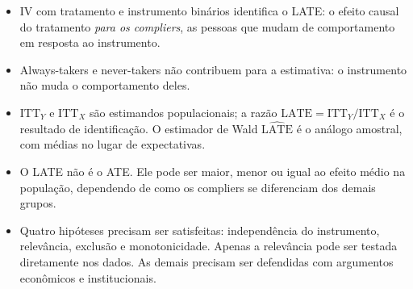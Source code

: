 \begin{notabox}
\begin{itemize}[leftmargin=*]
  \item IV com tratamento e instrumento binários identifica o LATE: o efeito causal do tratamento \textit{para os compliers}, as pessoas que mudam de comportamento em resposta ao instrumento.
  \item Always-takers e never-takers não contribuem para a estimativa: o instrumento não muda o comportamento deles.
  \item $\text{ITT}_Y$ e $\text{ITT}_X$ são estimandos populacionais; a razão $\text{LATE} = \text{ITT}_Y / \text{ITT}_X$ é o resultado de identificação. O estimador de Wald $\widehat{\text{LATE}}$ é o análogo amostral, com médias no lugar de expectativas.
  \item O LATE não é o ATE. Ele pode ser maior, menor ou igual ao efeito médio na população, dependendo de como os compliers se diferenciam dos demais grupos.
  \item Quatro hipóteses precisam ser satisfeitas: independência do instrumento, relevância, exclusão e monotonicidade. Apenas a relevância pode ser testada diretamente nos dados. As demais precisam ser defendidas com argumentos econômicos e institucionais.
\end{itemize}
\end{notabox}
